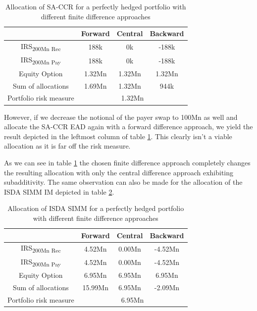 \documentclass[../Thesis_AHoecherl.tex]{subfiles}
\begin{document}
    \begin{table}[htbp]
        \centering
        \begin{tabular}{c|c|c|c}
            & Forward & Central & Backward \\
            \toprule
            IRS\textsubscript{200Mn Rec} & 188k & 0k & -188k \\
            \midrule
                IRS\textsubscript{200Mn Pay} & 188k & 0k & -188k\\
                \midrule
                Equity Option & 1.32Mn & 1.32Mn & 1.32Mn\\
                \bottomrule
                Sum of allocations & 1.69Mn & 1.32Mn & 944k \\
                \midrule
                Portfolio risk measure & \multicolumn{3}{c}{1.32Mn} \\
            \end{tabular}%
            \caption[Allocation of \gls{SA-CCR} for a perfectly hedged portfolio]{Allocation of \gls{SA-CCR} for a perfectly hedged portfolio with different finite difference approaches}
            \label{tab:EAD perfect hedge}
    \end{table}

    However, if we decrease the notional of the payer swap to 100Mn as well and allocate the \gls{SA-CCR} \gls{EAD} again with a forward difference approach, we yield the result depicted in the leftmost column of table \ref{tab:EAD perfect hedge}. This clearly isn't a viable allocation as it is far off the risk measure.
    
    As we can see in table \ref{tab:EAD perfect hedge} the chosen finite difference approach completely changes the resulting allocation with only the central difference approach exhibiting subadditivity.
    The same observation can also be made for the allocation of the \gls{ISDA SIMM} \gls{IM} depicted in table \ref{tab:IM perfect hedge}.
    \begin{table}[htbp]
        \centering
        \begin{tabular}{c|c|c|c}
            & Forward & Central & Backward \\
            \toprule
            IRS\textsubscript{200Mn Rec} & 4.52Mn & 0.00Mn & -4.52Mn \\
            \midrule
            IRS\textsubscript{200Mn Pay} & 4.52Mn & 0.00Mn & -4.52Mn \\
            \midrule
            Equity Option & 6.95Mn & 6.95Mn & 6.95Mn \\
            \bottomrule
            Sum of allocations & 15.99Mn & 6.95Mn & -2.09Mn \\
            \midrule
            Portfolio risk measure & \multicolumn{3}{c}{6.95Mn}  \\
        \end{tabular}%
        \caption[Allocation of \gls{ISDA SIMM} for a perfectly hedged portfolio]{Allocation of \gls{ISDA SIMM} for a perfectly hedged portfolio with different finite difference approaches}
        \label{tab:IM perfect hedge}
    \end{table}
    
\end{document}
